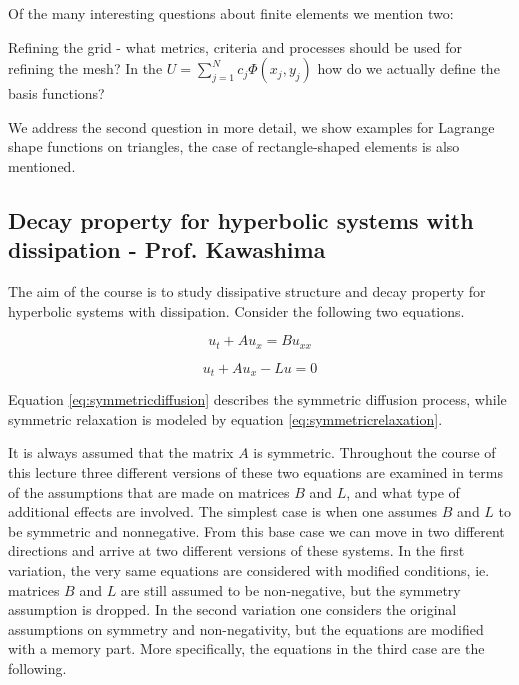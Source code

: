 \documentclass{article}
\begin{document}
Of the many interesting questions about finite elements we mention two:

\begin{outline}[enumerate]
\1 Refining the grid - what metrics, criteria and processes should be used for refining the mesh?
\1 In the $U = \sum_{j=1}^{N} c_j \Phi(x_j, y_j)$ how do we actually define the basis functions?
\end{outline}

We address the second question in more detail, we show examples for Lagrange shape functions on triangles, the case of rectangle-shaped elements is also mentioned.

\subsection{Decay property for hyperbolic systems with dissipation - Prof. Kawashima}
The aim of the course is to study dissipative structure and decay property for hyperbolic systems with dissipation. Consider the following two equations.

\begin{equation} \label{eq:symmetricdiffusion}
u_{t} + Au_{x} = Bu_{xx}
\end{equation}

\begin{equation} \label{eq:symmetricrelaxation}
u_{t} + Au_{x} -Lu = 0
\end{equation}

Equation \ref{eq:symmetricdiffusion} describes the symmetric diffusion process, while symmetric relaxation is modeled by equation \ref{eq:symmetricrelaxation}.

It is always assumed that the matrix $A$ is symmetric. Throughout the course of this lecture three different versions of these two equations are examined in terms of the assumptions that are made on matrices $B$ and $L$, and what type of additional effects are involved. The simplest case is when one assumes $B$ and $L$ to be symmetric and nonnegative. From this base case we can move in two different directions and arrive at two different versions of these systems. In the first variation, the very same equations are considered with modified conditions, ie. matrices $B$ and $L$ are still assumed to be non-negative, but the symmetry assumption is dropped. In the second variation one considers the original assumptions on symmetry and non-negativity, but the equations are modified with a memory part. More specifically, the equations in the third case are the following.
\end{document}
